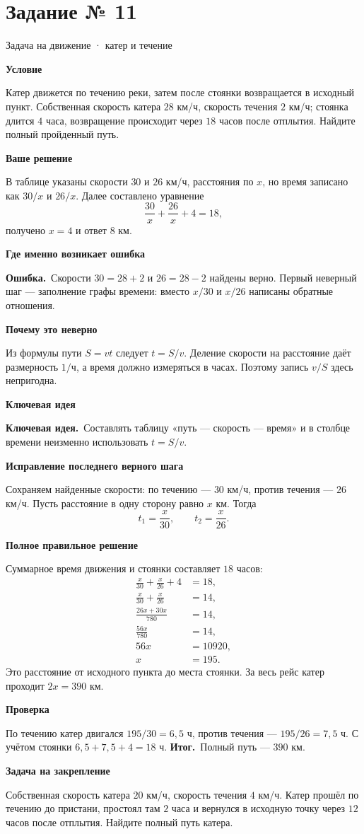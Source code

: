 \documentclass[a4paper,12pt]{article}
\newcommand{\keyidea}{\textcolor{accent}{\textbf{Ключевая идея.}}\ }
\newcommand{\wrong}{\textcolor{errorcolor}{\textbf{Ошибка.}}\ }
\newcommand{\result}{\textcolor{accent}{\textbf{Итог.}}\ }
\newcommand{\taskstart}[2]{\clearpage\phantomsection\label{task:#1}\section*{Задание № #1}\textcolor{accent}{#2}\par\vspace{2mm}}
\newcommand{\field}[1]{\par\smallskip\textbf{#1}\par\vspace{-3mm}}
\begin{document}
\taskstart{11}{Задача на движение · катер и течение}
\begingroup\small\setlength{\parskip}{4pt}
\field{Условие}
Катер движется по течению реки, затем после стоянки возвращается в исходный пункт. Собственная скорость катера $28$ км/ч, скорость течения $2$ км/ч; стоянка длится $4$ часа, возвращение происходит через $18$ часов после отплытия. Найдите полный пройденный путь.
\field{Ваше решение}
В таблице указаны скорости $30$ и $26$ км/ч, расстояния по $x$, но время записано как $30/x$ и $26/x$. Далее составлено уравнение
\[\frac{30}{x}+\frac{26}{x}+4=18,\]
получено $x=4$ и ответ $8$ км.
\field{Где именно возникает ошибка}
\wrong Скорости $30=28+2$ и $26=28-2$ найдены верно. Первый неверный шаг --- заполнение графы времени: вместо $x/30$ и $x/26$ написаны обратные отношения.
\field{Почему это неверно}
Из формулы пути $S=vt$ следует $t=S/v$. Деление скорости на расстояние даёт размерность $1/\text{ч}$, а время должно измеряться в часах. Поэтому запись $v/S$ здесь непригодна.
\field{Ключевая идея}
\keyidea Составлять таблицу «путь --- скорость --- время» и в столбце времени неизменно использовать $t=S/v$.
\field{Исправление последнего верного шага}
Сохраняем найденные скорости: по течению --- $30$ км/ч, против течения --- $26$ км/ч. Пусть расстояние в одну сторону равно $x$ км. Тогда
\[t_1=\frac{x}{30},\qquad t_2=\frac{x}{26}.\]
\field{Полное правильное решение}
Суммарное время движения и стоянки составляет $18$ часов:
\begin{align*}
\frac{x}{30}+\frac{x}{26}+4&=18,\\
\frac{x}{30}+\frac{x}{26}&=14,\\
\frac{26x+30x}{780}&=14,\\
\frac{56x}{780}&=14,\\
56x&=10920,\\
x&=195.
\end{align*}
Это расстояние от исходного пункта до места стоянки. За весь рейс катер проходит $2x=390$ км.
\field{Проверка}
По течению катер двигался $195/30=6{,}5$ ч, против течения --- $195/26=7{,}5$ ч. С учётом стоянки $6{,}5+7{,}5+4=18$ ч.
\result Полный путь --- $\boxed{390\text{ км}}$.
\field{Задача на закрепление}
Собственная скорость катера $20$ км/ч, скорость течения $4$ км/ч. Катер прошёл по течению до пристани, простоял там $2$ часа и вернулся в исходную точку через $12$ часов после отплытия. Найдите полный путь катера.
\end{document}
